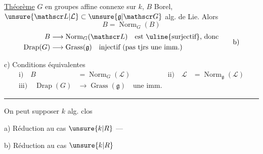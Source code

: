 \uline{Théorème} $G$  en groupes affine connexe sur $k$, $B$ Borel, $\unsure{\mathscr L|\mathcal L}\subset\unsure{\mathfrak g|\mathscr G}$ alg. de Lie. Alors
\[
B=\operatorname{Norm}_{G}(B)\tag*{a)}
\]
\[
\begin{aligned}
B&\longrightarrow\operatorname{Norm}_{G}(\mathscr L)\quad\text{est \uline{surjectif}, donc}\\
\operatorname{Drap}(G)&\longrightarrow\operatorname{Grass}(\mathfrak g)\quad\text{injectif (pas tjrs une imm.)}
\end{aligned}
\tag*{b)}
\]

 c) Conditions équivalentes
\[
\begin{aligned}
\text{i)}\quad B&=\operatorname{Norm}_{G}(\mathscr L)
&\text{ii)}\quad\mathscr L&=\operatorname{Norm}_{\mathfrak g}(\mathscr L)\\
\text{iii)}\quad\operatorname{Drap}(G)&\longrightarrow\operatorname{Grass}(\mathfrak g)\quad\text{une imm.}
\end{aligned}
\]
\smallskip\hrule\smallskip
On peut supposer $k$ alg. clos

 a) Réduction au cas $\unsure{k|R}$  ---

 b)  Réduction au cas $\unsure{k|R}$   

